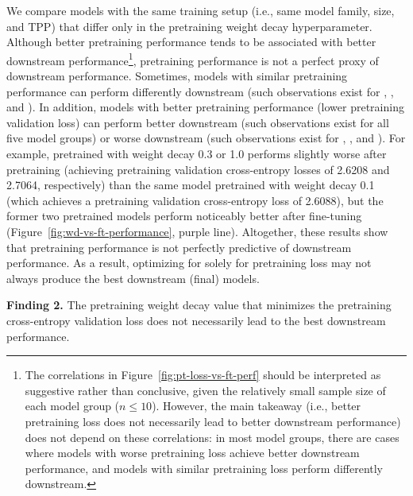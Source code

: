 We compare models with the same training setup (i.e., same model family, size, and TPP) that differ only in the pretraining weight decay hyperparameter. Although better pretraining performance tends to be associated with better downstream performance\footnote{The correlations in Figure~\ref{fig:pt-loss-vs-ft-perf} should be interpreted as suggestive rather than conclusive, given the relatively small sample size of each model group ($n \leq 10$). However, the main takeaway (i.e., better pretraining loss does not necessarily lead to better downstream performance) does not depend on these correlations: in most model groups, there are cases where models with worse pretraining loss achieve better downstream performance, and models with similar pretraining loss perform differently downstream.}, pretraining performance is not a perfect proxy of downstream performance.
Sometimes, models with similar pretraining performance can perform differently downstream (such observations exist for \llamazeropointfiveB{}, \llamaoneB{}, and \olmoonex{}). 
In addition, models with better pretraining performance (lower pretraining validation loss) can perform better downstream (such observations exist for all five model groups) or worse downstream (such observations exist for \llamazeropointfiveB{}, \llamaoneB{}, and \olmosevenx{}).  
For example, \olmosevenx{} pretrained with weight decay 0.3 or 1.0 performs slightly worse after pretraining (achieving pretraining validation cross-entropy losses of 2.6208 and 2.7064, respectively) than the same model pretrained with weight decay 0.1 (which achieves a pretraining validation cross-entropy loss of 2.6088), but the former two pretrained models perform noticeably better after fine-tuning (Figure~\ref{fig:wd-vs-ft-performance}, purple line).
Altogether, these results show that pretraining performance is not perfectly predictive of downstream performance. As a result, optimizing for solely for pretraining loss may not always produce the best downstream (final) models.





\begin{finding}
\textbf{Finding 2.} The pretraining weight decay value that minimizes the pretraining cross-entropy validation loss does not necessarily lead to the best downstream performance.
\end{finding}



